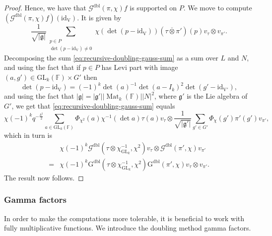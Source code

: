 \documentclass[12pt, reqno]{amsart}
\theoremstyle{definition}
\theoremstyle{definition}
\theoremstyle{definition}
\newcommand{\idmap}{\mathrm{id}}
\newcommand{\sizeof}[1]{\left|#1\right|}
\newcommand{\hermitianSpace}{\mathrm{V}}
\newcommand{\GL}{\mathrm{GL}}
\newcommand{\finiteField}{\mathbb{F}}
\newcommand{\squareMatrix}{\operatorname{Mat}}
\newcommand{\dblGaussSum}[2]{\mathcal{G}^{\mathrm{dbl}}\left(#1, #2\right)}
\newcommand{\dblGaussSumScalar}[2]{\mathrm{G}^{\mathrm{dbl}}\left(#1, #2\right)}
\newcommand{\lieAlgebra}{\mathfrak{g}}
\begin{document}
\begin{proof}
	Hence, we have that $\dblGaussSum{\pi}{\chi} f$ is supported on $P$. We move to compute $\left(\dblGaussSum{\pi}{\chi} f\right)\left(\idmap_{\hermitianSpace}\right)$. It is given by
	\begin{equation}\label{eq:recursive-doubling-gauss-sum}
		\frac{1}{\sqrt{\sizeof{\lieAlgebra}}} \sum_{\substack{p \in P\\
				\det\left(p - \idmap_{\hermitianSpace}\right) \ne 0}} \chi\left(\det\left(p - \idmap_{\hermitianSpace}\right)\right) \left(\tau \overline{\otimes} \pi'\right)\left(p\right) v_{\tau} \otimes v_{\pi'}.
	\end{equation}
	Decomposing the sum \eqref{eq:recursive-doubling-gauss-sum} as a sum over $L$ and $N$, and using the fact that if $p \in P$ has Levi part with image $\left(a, g'\right) \in \GL_k\left(\finiteField\right) \times G'$ then $$\det\left(p - \idmap_{\hermitianSpace}\right) = \left(-1\right)^k \det\left(a\right)^{-1}\det\left(a - I_k\right)^2 \det\left( g' - \idmap_{\hermitianSpace'}\right),$$
	and using the fact that $\sizeof{\lieAlgebra} = \sizeof{\lieAlgebra'} \sizeof{\squareMatrix_k\left(\finiteField\right)} \sizeof{N}^2$, where $\lieAlgebra'$ is the Lie algebra of $G'$,
	we get that \eqref{eq:recursive-doubling-gauss-sum} equals
	\begin{equation}
		\chi\left(-1\right)^k q^{-\frac{k^2}{2}} \sum_{a \in \GL_k\left(\finiteField\right)} \Phi_{\chi^2}\left(a\right) \chi^{-1}\left(\det a\right) \tau\left(a\right) v_{\tau} \otimes \frac{1}{\sqrt{\sizeof{\lieAlgebra'}}} \sum_{g' \in G'} \Phi_{\chi}\left(g'\right) \pi'\left(g'\right) v_{\pi'},
	\end{equation}
	which in turn is
	\begin{align*}
		&\chi\left(-1\right)^k \dblGaussSum{\tau \otimes \chi_{\GL_k}^{-1}}{\chi^2} v_{\tau} \otimes \dblGaussSum{\pi'}{\chi} v_{\pi'}\\
		=& \chi\left(-1\right)^k\dblGaussSumScalar{\tau \otimes \chi_{\GL_k}^{-1}}{\chi^2} \dblGaussSumScalar{\pi'}{\chi} v_{\tau} \otimes v_{\pi'}.
	\end{align*}
	The result now follows.
\end{proof}

\subsubsection{Gamma factors}
In order to make the computations more tolerable, it is beneficial to work with fully multiplicative functions. We introduce the doubling method gamma factors.
\end{document}
